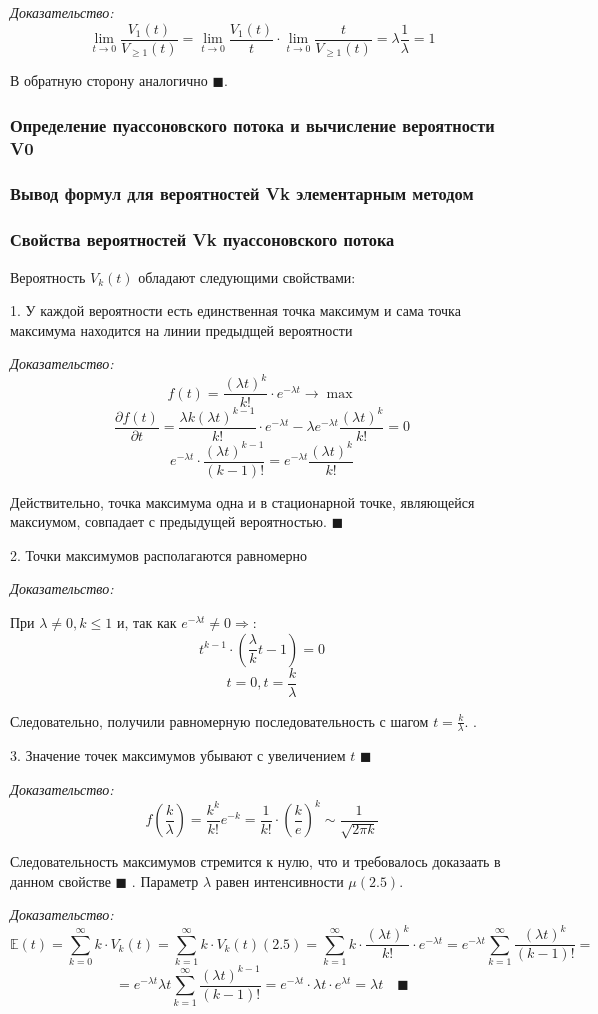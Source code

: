 \documentclass[aps,%
12pt,%
final,%
oneside,
onecolumn,%
musixtex, %
superscriptaddress,%
centertags]{article} %
\theoremstyle{plain}
\begin{document}
\textit{Доказательство:}
$$\lim_{t \to 0} \frac{V_{1}(t)}{V_{\geq 1}(t)} = \lim_{t \to 0} \frac{V_{1}(t)}{t} \cdot \lim_{t \to 0} \frac{t}{V_{\geq 1}(t)} = \lambda \frac{1}{\lambda} = 1$$

В обратную сторону аналогично $\blacksquare$.

\subsubsection{Определение пуассоновского потока и вычисление вероятности V0}
\subsubsection{Вывод формул для вероятностей Vk элементарным методом}
\subsubsection{Свойства вероятностей Vk пуассоновского потока}

Вероятность $V_k(t)$ обладают следующими свойствами:

1. У каждой вероятности есть единственная точка максимум и сама точка максимума находится на линии предыдщей вероятности

\textit{Доказательство:}
$$f(t) = \frac{(\lambda t)^k}{k!} \cdot e^{-\lambda t} \to \max $$
$$\frac{\partial f(t)}{\partial t} = \frac{\lambda k (\lambda t)^{k-1}}{k!} \cdot e^{-\lambda t} - \lambda e^{-\lambda t} \frac{(\lambda t)^k}{k!} = 0$$
$$e^{-\lambda t} \cdot \frac{(\lambda t)^{k-1}}{(k-1)!} = e^{-\lambda t} \frac{(\lambda t)^k}{k!} $$

Действительно, точка максимума одна и в стационарной точке, являющейся максиумом, совпадает с предыдущей вероятностью. $\blacksquare$

2. Точки максимумов располагаются равномерно 

\textit{Доказательство:}

При $\lambda \neq 0, k \leq 1$ и, так как $e^{-\lambda t} \neq 0 \Rightarrow$:
$$ t^{k-1} \cdot ({\frac{\lambda}{k}t - 1})=0$$
$$t=0, t=\frac{k}{\lambda}$$

Следовательно, получили равномерную последовательность с шагом $t=\frac{k}{\lambda}$. .

3. Значение точек максимумов убывают с увеличением $t$ $\blacksquare$

\textit{Доказательство:}
$$f(\frac{k}{\lambda}) = \frac{k^k}{k!}e^{-k} = \frac{1}{k!}\cdot \left (\frac{k}{e} \right )^k \sim \frac{1}{\sqrt {2\pi k}}$$

Следовательность максимумов стремится к нулю, что и требовалось доказаать в данном свойстве $\blacksquare$
. Параметр $\lambda $ равен интенсивности $\mu (2.5)$.

\textit{Доказательство:}
$$\mathbb{E}(t) =\sum_{k=0}^{\infty} k \cdot V_k(t) = \sum_{k=1}^{\infty} k \cdot V_k(t) (2.5) = \sum_{k=1}^{\infty} k \cdot \frac{(\lambda t)^k}{k!} \cdot e^{-\lambda t} =e^{-\lambda t}  \sum_{k=1}^{\infty} \frac{(\lambda t)^k}{(k-1)!} =$$
$$=e^{-\lambda t} \lambda t \sum_{k=1}^{\infty} \frac{(\lambda t)^{k-1}}{(k-1)!} = e^{-\lambda t} \cdot \lambda t \cdot e^{\lambda t} = \lambda t \quad \blacksquare$$
\end{document}

